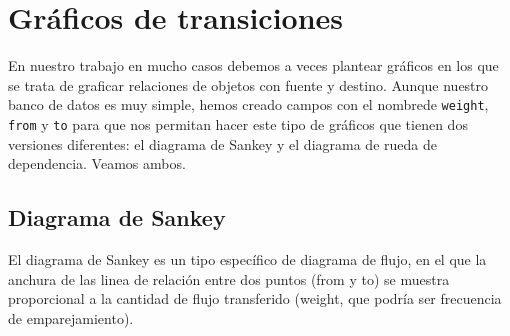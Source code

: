 \documentclass[
]{book}
\newenvironment{Shaded}{\begin{snugshade}}{\end{snugshade}}
\newcommand{\AttributeTok}[1]{\textcolor[rgb]{0.77,0.63,0.00}{#1}}
\newcommand{\ConstantTok}[1]{\textcolor[rgb]{0.00,0.00,0.00}{#1}}
\newcommand{\FunctionTok}[1]{\textcolor[rgb]{0.00,0.00,0.00}{#1}}
\newcommand{\NormalTok}[1]{#1}
\newcommand{\SpecialCharTok}[1]{\textcolor[rgb]{0.00,0.00,0.00}{#1}}
\newcommand{\StringTok}[1]{\textcolor[rgb]{0.31,0.60,0.02}{#1}}
\begin{document}
\hypertarget{gruxe1ficos-de-transiciones}{%
\section{Gráficos de transiciones}\label{gruxe1ficos-de-transiciones}}

En nuestro trabajo en mucho casos debemos a veces plantear gráficos en los que se trata de graficar relaciones de objetos con fuente y destino. Aunque nuestro banco de datos es muy simple, hemos creado campos con el nombrede \texttt{weight}, \texttt{from} y \texttt{to} para que nos permitan hacer este tipo de gráficos que tienen dos versiones diferentes: el diagrama de Sankey y el diagrama de rueda de dependencia. Veamos ambos.

\hypertarget{diagrama-de-sankey}{%
\subsection{Diagrama de Sankey}\label{diagrama-de-sankey}}

El diagrama de Sankey es un tipo específico de diagrama de flujo, en el que la anchura de las linea de relación entre dos puntos (from y to) se muestra proporcional a la cantidad de flujo transferido (weight, que podría ser frecuencia de emparejamiento).

\begin{Shaded}
\end{Shaded}
\end{document}
